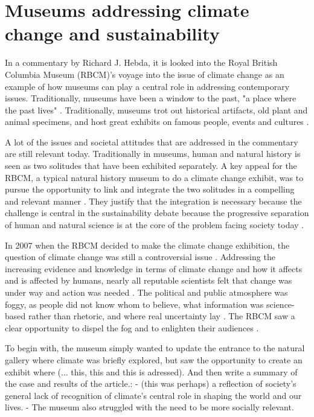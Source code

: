 \section{Museums addressing climate change and sustainability}
In a commentary by Richard J. Hebda, it is looked into the Royal British Columbia Museum (RBCM)’s voyage into the issue of climate change as an example of how museums can play a central role in addressing contemporary issues. Traditionally, museums have been a window to the past, "a place where the past lives" \autocite[p. 1]{hebda_article}.  Traditionally, museums trot out historical artifacts, old plant and animal specimens, and host great exhibits on famous people, events and cultures \autocite[p.1]{hebda_article}.
\par
A lot of the issues and societal attitudes that are addressed in the commentary are still relevant today. Traditionally in museums, human and natural history is seen as two solitudes that have been exhibited separately. A key appeal for the RBCM, a typical natural history museum to do a climate change exhibit, was to pursue the opportunity to link and integrate the two solitudes in a compelling and relevant manner \autocite[p. 2]{hebda_article}. They justify that the integration is necessary because the challenge is central in the sustainability debate because the progressive separation of human and natural science is at the core of the problem facing society today \autocite[p.2]{hebda_article}.

In 2007 when the RBCM decided to make the climate change exhibition, the question of climate change was still a controversial issue \autocite[p.2]{hebda_article}. Addressing the increasing evidence and knowledge in terms of climate change and how it affects and is affected by humans, nearly all reputable scientists felt that change was under way and action was needed \autocite[p.2]{hebda_article}. The political and public atmosphere was foggy, as people did not know whom to believe, what information was science-based rather than rhetoric, and where real uncertainty lay \autocite[p.2]{hebda_article}. The RBCM saw a clear opportunity to dispel the fog and to enlighten their audiences \autocite[p.2]{hebda_article}.

To begin with, the museum simply wanted to update the entrance to the natural gallery where climate was briefly explored, but saw the opportunity to create an exhibit where (... this, this and this is adressed). And then write a summary of the case and results of the article.:
- (this was perhaps) a reflection of society’s general lack of recognition of climate’s central role in shaping the world and our lives.
- The museum also struggled with the need to be more socially relevant.


